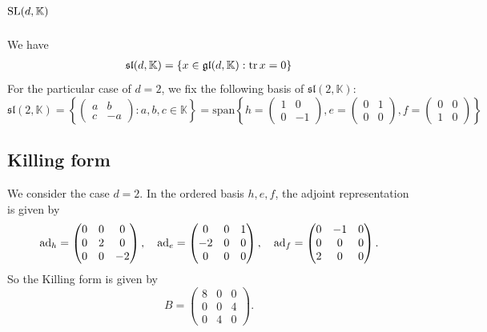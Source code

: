 \documentclass{report}
\begin{document}
\section{$\operatorname{{\mathrm{SL}}}(d,\mathbb K)$}
We have
\begin{align*}
    \mathfrak{sl}(d, \mathbb K) &= \{ x \in \operatorname{{\mathfrak{gl}}}(d, \mathbb K) : \operatorname{tr} x = 0\}\\
\end{align*}
For the particular case of $d = 2$, we fix the following basis of $\mathfrak{sl}(2, \mathbb K)$:
\[
\mathfrak{sl}(2, \mathbb K) = \left\{ \begin{pmatrix} a & b \\ c & -a \end{pmatrix} : a,b,c \in \mathbb K \right\} = \mathrm{span}\left\{ h = \begin{pmatrix} 1 & 0 \\ 0 & -1 \end{pmatrix}, e = \begin{pmatrix} 0 & 1 \\ 0 & 0 \end{pmatrix}, f = \begin{pmatrix} 0 & 0 \\ 1 & 0 \end{pmatrix} \right\}
\]
\subsection{Killing form}
We consider the case $d = 2$.
In the ordered basis $h,e,f$, the adjoint representation is given by
\[
\operatorname{ad}_h = \begin{pmatrix} 0 & 0 & 0 \\ 0 & 2 & 0 \\ 0 & 0 & -2 \end{pmatrix}, \quad
\operatorname{ad}_e = \begin{pmatrix} 0 & 0 & 1 \\ -2 & 0 & 0 \\ 0 & 0 & 0 \end{pmatrix}, \quad
\operatorname{ad}_f = \begin{pmatrix} 0 & -1 & 0 \\ 0 & 0 & 0 \\ 2 & 0 & 0 \end{pmatrix}.
\]
So the Killing form is given by
\[
B = \begin{pmatrix} 8 & 0 & 0 \\ 0 & 0 & 4 \\ 0 & 4 & 0 \end{pmatrix}.
\]
\end{document}
